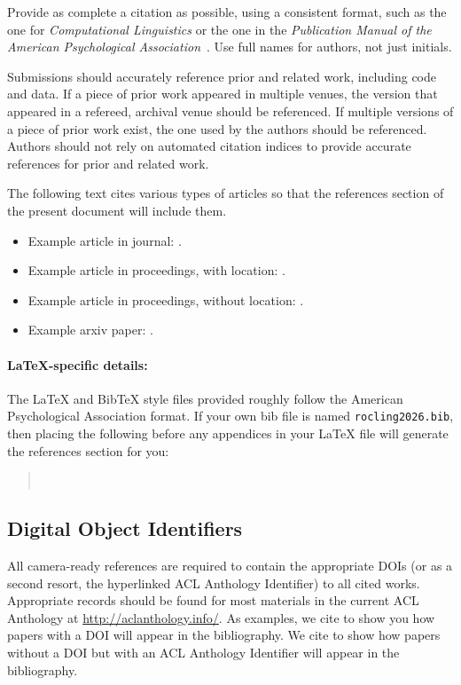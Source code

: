 \documentclass[11pt,a4paper]{article}
\begin{document}
Provide as complete a citation as possible, using a consistent format, such as the one for \emph{Computational Linguistics\/} or the one in the  \emph{Publication Manual of the American 
Psychological Association\/}~\citep{APA:83}.
Use full names for authors, not just initials.

Submissions should accurately reference prior and related work, including code and data.
If a piece of prior work appeared in multiple venues, the version that appeared in a refereed, archival venue should be referenced.
If multiple versions of a piece of prior work exist, the one used by the authors should be referenced.
Authors should not rely on automated citation indices to provide accurate references for prior and related work.

The following text cites various types of articles so that the references section of the present document will include them.
\begin{itemize}
\item Example article in journal: \citep{Chandra:81}.
\item Example article in proceedings, with location: \citep{goodman-etal-2016-noise}.
\item Example article in proceedings, without location: \citep{andrew2007scalable}.
\item Example arxiv paper: \citep{rasooli-tetrault-2015}. 
\end{itemize}


\paragraph{\LaTeX-specific details:}
The \LaTeX{} and Bib\TeX{} style files provided roughly follow the American Psychological Association format.
If your own bib file is named \texttt{\small rocling2026.bib}, then placing the following before any appendices in your \LaTeX{}  file will generate the references section for you:
\begin{quote}\small
\verb||\\
\verb||
\end{quote}


\subsection{Digital Object Identifiers}
All camera-ready references are required to contain the appropriate DOIs (or as a second resort, the hyperlinked ACL Anthology Identifier) to all cited works.
Appropriate records should be found for most materials in the current ACL Anthology at \url{http://aclanthology.info/}.
As examples, we cite \citep{goodman-etal-2016-noise} to show you how papers with a DOI will appear in the bibliography.
We cite \citep{harper-2014-learning} to show how papers without a DOI but with an ACL Anthology Identifier will appear in the bibliography.
\end{document}
